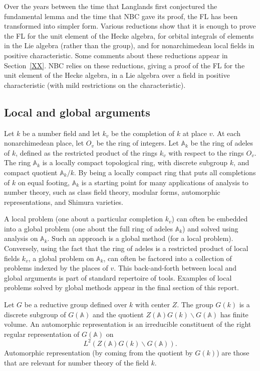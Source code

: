 \documentclass[brochure,english,12pt]{bourbaki}
\newcommand{\ring}[1]{\mathbb{#1}}
\def\AD{\ring{A}}
\begin{document}
Over the years between the time that Langlands first conjectured the
fundamental lemma and the time that NBC gave its proof, the FL has
been transformed into simpler form.  Various reductions show that it
is enough to prove the FL for the unit element of the Hecke algebra,
for orbital integrals of elements in the Lie algebra (rather than the
group), and for nonarchimedean local fields in positive
characteristic.  Some comments about these reductions appear in
Section~\ref{XX}.  NBC relies on these reductions, giving a proof of
the FL for the unit element of the Hecke algebra, in a Lie algebra
over a field in positive characteristic (with mild restrictions on the
characteristic).


\subsection{Local and global arguments}

Let $k$ be a number field and let $k_v$ be the completion of $k$ at
place $v$.  At each nonarchimedean place, let $O_v$ be the ring of
integers.  Let $\AD_k$ be the ring of adeles of $k$, defined as the
restricted product of the rings $k_v$ with respect to the rings $O_v$.
The ring $\AD_k$ is a locally compact topological ring, with discrete
subgroup $k$, and compact quotient $\AD_k/k$.  By being a locally
compact ring that puts all completions of $k$ on equal footing, $\AD_k$
is a starting point for many applications of analysis to number
theory, such as class field theory, modular forms, automorphic
representations, and Shimura varieties.


A local problem (one about a particular completion $k_v$) can often be
embedded into a global problem (one about the full ring of adeles
$\AD_k$) and solved using analysis on $\AD_k$.  Such an approach is a
global method (for a local problem).  Conversely, using the fact that
the ring of adeles is a restricted product of local fields $k_v$, a
global problem on $\AD_k$, can often be factored into a collection of
problems indexed by the places of $v$.  This back-and-forth between
local and global arguments is part of standard repertoire of tools.
Examples of local problems solved by global methods appear in the
final section of this report.


Let $G$ be a reductive group defined over $k$ with center $Z$.  The
group $G(k)$ is a discrete subgroup of $G(\AD)$ and the quotient
$Z(\AD)G(k)\backslash G(\AD)$ has finite volume.  An automorphic
representation is an irreducible constituent of the right regular
representation of $G(\AD)$ on 
\[
L^2(Z(\AD) G(k)\backslash G(\AD)).
\]
Automorphic representation (by coming from the quotient by $G(k)$) are
those that are relevant for number theory of the field $k$.
\end{document}
